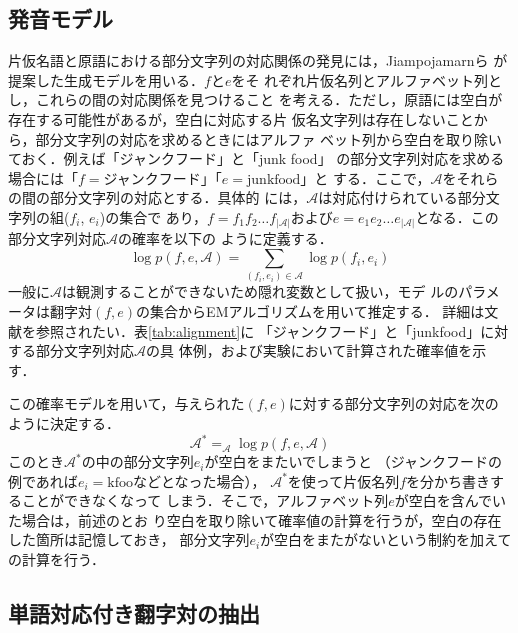 \documentclass[japanese]{jnlp_1.4}
\newcommand{\argmax}{}
\begin{document}
\subsection{発音モデル} \label{sec:phonetic_model}

片仮名語と原語における部分文字列の対応関係の発見には，Jiampojamarnら
\citeyear{Jiampojamarn07}が提案した生成モデルを用いる．$f$と$e$をそ
れぞれ片仮名列とアルファベット列とし，これらの間の対応関係を見つけること
を考える．ただし，原語には空白が存在する可能性があるが，空白に対応する片
仮名文字列は存在しないことから，部分文字列の対応を求めるときにはアルファ
ベット列から空白を取り除いておく．例えば「ジャンクフード」と「junk food」
の部分文字列対応を求める場合には「$f=\text{ジャンクフード}$」「$e=\text{junkfood}$」と
する．ここで，$\mathcal{A}$をそれらの間の部分文字列の対応とする．具体的
には，$\mathcal{A}$は対応付けられている部分文字列の組($f_i$, $e_i$)の集合で
あり，$f=f_1f_2\dots f_{|\mathcal{A}|}$および$e=e_1e_2\dots
e_{|\mathcal{A}|}$となる．この部分文字列対応$\mathcal{A}$の確率を以下の
ように定義する．
\[
 \log p(f,e,\mathcal{A})=\sum_{(f_i,e_i)\in\mathcal{A}}\log p(f_{i},e_{i})
\]
一般に$\mathcal{A}$は観測することができないため隠れ変数として扱い，モデ
ルのパラメータは翻字対$(f,e)$の集合からEMアルゴリズムを用いて推定する．
詳細は文献\cite{Jiampojamarn07}を参照されたい．表\ref{tab:alignment}に
「ジャンクフード」と「junkfood」に対する部分文字列対応$\mathcal{A}$の具
体例，および実験において計算された確率値を示す．

この確率モデルを用いて，与えられた$(f,e)$に対する部分文字列の対応を次の
ように決定する．
\[
\mathcal{A}^{*}=\argmax_{\mathcal{A}}\log p(f,e,\mathcal{A})
\]
このとき$\mathcal{A}^{*}$の中の部分文字列$e_i$が空白をまたいでしまうと
（ジャンクフードの例であれば$e_i=\text{kfoo}$などとなった場合），
$\mathcal{A}^{*}$を使って片仮名列$f$を分かち書きすることができなくなって
しまう．そこで，アルファベット列$e$が空白を含んでいた場合は，前述のとお
り空白を取り除いて確率値の計算を行うが，空白の存在した箇所は記憶しておき，
部分文字列$e_i$が空白をまたがないという制約を加えて$\argmax$の計算を行う．

\begin{table}[t]
\label{tab:alignment}

\end{table}


\subsection{単語対応付き翻字対の抽出} \label{sec:extraction}
\end{document}
